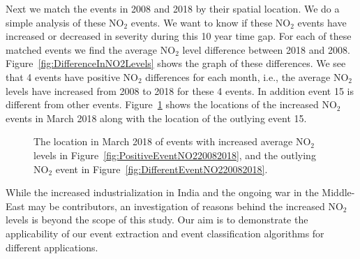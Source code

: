 \documentclass[a4paper,11pt]{article}
\begin{document}
Next we match the events in 2008 and 2018 by their spatial location. We do a simple analysis of these $\text{NO}_2$ events. We want to know if these $\text{NO}_2$ events have increased or decreased in severity during this 10 year time gap. For each of these matched events we find the average $\text{NO}_2$ level difference between 2018 and 2008. Figure~\ref{fig:DifferenceInNO2Levels} shows the graph of these differences. We see that 4 events have positive $\text{NO}_2$ differences for each month, i.e., the average $\text{NO}_2$ levels have increased from 2008 to 2018 for these 4 events. In addition event 15 is different from other events. Figure~\ref{fig:PositiveDifferentEventsNO220082018} shows the locations of the increased $\text{NO}_2$ events in March 2018 along with the location of the outlying event 15.

\begin{figure}
	\centering
	\caption{The location in March 2018 of events with increased average $\text{NO}_2$ levels in Figure~\ref{fig:PositiveEventNO220082018}, and the outlying $\text{NO}_2$ event in Figure~\ref{fig:DifferentEventNO220082018}.}
	\label{fig:PositiveDifferentEventsNO220082018}
\end{figure}

While the increased industrialization in India and the ongoing war in the Middle-East  may be contributors, an investigation of reasons behind the increased $\text{NO}_2$ levels is beyond the scope of this study. Our aim is to demonstrate the applicability of our event extraction and event classification algorithms for different applications.
\end{document}
